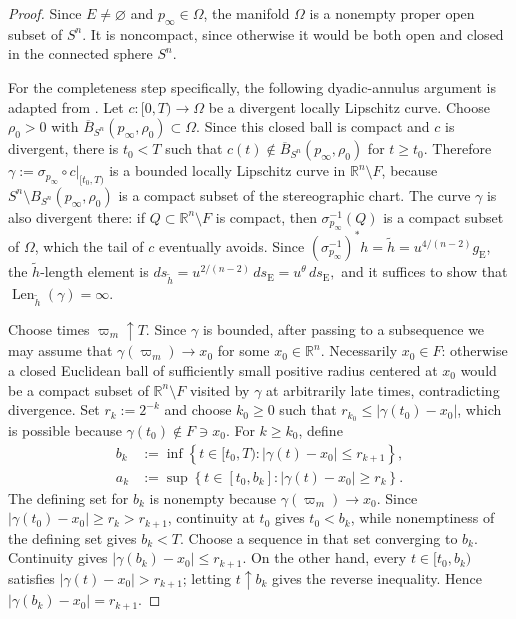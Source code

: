 \documentclass[12pt,oneside,a4paper]{article}
\theoremstyle{mytheorem}
\theoremstyle{remark}
\theoremstyle{definition}
\begin{document}
\begin{proof}
Since $E\ne\varnothing$
and $p_\infty\in\Omega$, the manifold $\Omega$ is a nonempty proper open subset
of $S^n$.  It is noncompact, since otherwise it would be both open and
closed in the connected sphere $S^n$.

For the completeness step specifically, the following dyadic-annulus
argument is adapted from
\cite[proof of Theorem~1.1, implication
\textup{(ii)}$\Rightarrow$\textup{(i)}, equations~(4.3)--(4.7)]{zbMATH07873599}.
Let $c:[0,T)\to\Omega$ be a divergent locally Lipschitz curve.  Choose $\rho_0>0$ with
$\overline B_{S^n}(p_\infty,\rho_0)\subset\Omega$.  Since this closed
ball is compact and $c$ is divergent, there is $t_0<T$ such that
$c(t)\notin\overline B_{S^n}(p_\infty,\rho_0)$ for $t\ge t_0$.
Therefore $\gamma:=\sigma_{p_\infty}\circ c|_{[t_0,T)}$
is a bounded locally Lipschitz curve in $\mathbb{R}^n\setminus F$, because
$S^n\setminus B_{S^n}(p_\infty,\rho_0)$ is a compact subset of the stereographic
chart.  The curve $\gamma$ is
also divergent there: if $Q\subset\mathbb{R}^n\setminus F$ is compact,
then $\sigma_{p_\infty}^{-1}(Q)$ is a compact subset of $\Omega$, which the tail
of $c$ eventually avoids.  Since
$(\sigma_{p_\infty}^{-1})^*h=\widetilde h=u^{4/(n-2)}g_{\mathrm E}$, the
$\widetilde h$-length element is
$ds_{\widetilde h}=u^{2/(n-2)}\,ds_{\mathrm E}=u^\theta\,ds_{\mathrm E},$
and it suffices to show that
$\operatorname{Len}_{\widetilde h}(\gamma)=\infty$.

Choose times $\varpi_m\uparrow T$.  Since $\gamma$ is bounded, after passing
to a subsequence we may assume that $\gamma(\varpi_m)\to x_0$ for some
$x_0\in\mathbb{R}^n$.  Necessarily $x_0\in F$: otherwise a closed
Euclidean ball of sufficiently small positive radius centered at $x_0$
would be a compact subset of
$\mathbb{R}^n\setminus F$ visited by $\gamma$ at arbitrarily late times,
contradicting divergence.  Set $r_k:=2^{-k}$ and choose $k_0\ge0$ such
that $r_{k_0}\le|\gamma(t_0)-x_0|$, which is possible because
$\gamma(t_0)\notin F\ni x_0$.  For $k\ge k_0$, define
\[
\begin{aligned}
 b_k
 &:=
 \inf\left\{
 t\in[t_0,T):
 |\gamma(t)-x_0|\le r_{k+1}
 \right\},\\
 a_k
 &:=
 \sup\left\{
 t\in[t_0,b_k]:
 |\gamma(t)-x_0|\ge r_k
 \right\}.
\end{aligned}
\]
The defining set for $b_k$ is nonempty because $\gamma(\varpi_m)\to x_0$.
Since $|\gamma(t_0)-x_0|\ge r_k>r_{k+1}$, continuity at $t_0$ gives
$t_0<b_k$, while nonemptiness of the defining set gives $b_k<T$.
Choose a sequence in that set converging to $b_k$.  Continuity gives
$|\gamma(b_k)-x_0|\le r_{k+1}$.  On the other hand, every
$t\in[t_0,b_k)$
satisfies $|\gamma(t)-x_0|>r_{k+1}$; letting $t\uparrow b_k$ gives the
reverse inequality.  Hence $|\gamma(b_k)-x_0|=r_{k+1}$.


\end{proof}
\end{document}
